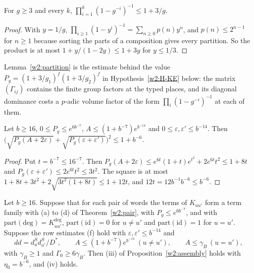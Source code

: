 \begin{lemma}\label{w2:partition}
For $g\ge3$ and every $k$, $\prod_{i=1}^k(1-g^{-i})^{-1}\le1+3/g$.
\end{lemma}

\begin{proof}
With $y=1/g$, $\prod_{i\ge1}(1-y^i)^{-1}=\sum_{n\ge0}p(n)y^n$, and $p(n)\le2^{n-1}$ for $n\ge1$ because sorting the parts of a composition gives every partition. So the product is at most $1+y/(1-2y)\le1+3y$ for $y\le1/3$.
\end{proof}

Lemma~\ref{w2:partition} is the estimate behind the value $P_g=(1+3/g_1)^f(1+3/g_2)^f$ in Hypothesis~\ref{w2:H-KE} below: the matrix $(\Gamma_{ij})$ contains the finite group factors at the typed places, and its diagonal dominance costs a $p$-adic volume factor of the form $\prod_i(1-g^{-i})^{-1}$ at each of them.

\begin{lemma}\label{w2:close}
Let $b\ge16$, $0\le P_g\le e^{6b^{-7}}$, $A\le(1+b^{-7})e^{b^{-14}}$ and $0\le\varepsilon,\varepsilon'\le b^{-14}$. Then $\bigl(\sqrt{P_g(A+2\varepsilon)}+\sqrt{P_g(\varepsilon+\varepsilon')}\bigr)^2\le1+b^{-6}$.
\end{lemma}

\begin{proof}
Put $t=b^{-7}\le16^{-7}$. Then $P_g(A+2\varepsilon)\le e^{6t}(1+t)e^{t^2}+2e^{6t}t^2\le1+8t$ and $P_g(\varepsilon+\varepsilon')\le2e^{6t}t^2\le3t^2$. The square is at most $1+8t+3t^2+2\sqrt{3t^2(1+8t)}\le1+12t$, and $12t=12b^{-1}b^{-6}\le b^{-6}$.
\end{proof}

\begin{corollary}\label{w2:offdiag}
Let $b\ge16$. Suppose that for each pair of words the terms of $K_{uu'}$ form a term family with (a) to (d) of Theorem~\ref{w2:pair}, with $P_g\le e^{6b^{-7}}$, and with $\mathrm{part}(\mathrm{deg})=K^{\deg}_{uu'}$, $\mathrm{part}(\mathrm{id})=0$ for $u\ne u'$ and $\mathrm{part}(\mathrm{id})=1$ for $u=u'$. Suppose the row estimates (f) hold with $\varepsilon,\varepsilon'\le b^{-14}$ and
\[
dd=d^S_ud^S_{u'}/D^*,\qquad A\le(1+b^{-7})e^{b^{-14}}\ (u\ne u'),\qquad A\le\gamma_B\ (u=u'),
\]
with $\gamma_B\ge1$ and $\Gamma_0\ge6\gamma_B$. Then (iii) of Proposition~\ref{w2:assembly} holds with $\eta_0=b^{-6}$, and (iv) holds.
\end{corollary}

